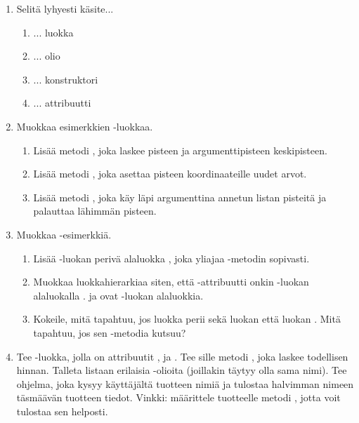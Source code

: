 \begin{enumerate}[\thesection .1]

\item Selitä lyhyesti käsite...
\begin{enumerate}
\item ... luokka
\item ... olio
\item ... konstruktori
\item ... attribuutti
\end{enumerate}

\item Muokkaa esimerkkien -luokkaa.
\begin{enumerate}
\item Lisää metodi , joka laskee pisteen ja argumenttipisteen keskipisteen.
\item Lisää metodi , joka asettaa pisteen koordinaateille uudet arvot.
\item Lisää metodi , joka käy läpi argumenttina annetun listan pisteitä ja palauttaa lähimmän pisteen.
\end{enumerate}

\item Muokkaa -esimerkkiä.
\begin{enumerate}
\item Lisää -luokan perivä alaluokka , joka yliajaa -metodin sopivasti.
\item Muokkaa luokkahierarkiaa siten, että -attribuutti onkin -luokan alaluokalla .  ja  ovat -luokan alaluokkia.
\item Kokeile, mitä tapahtuu, jos luokka  perii sekä luokan  että luokan . Mitä tapahtuu, jos sen -metodia kutsuu?
\end{enumerate}

\item Tee -luokka, jolla on attribuutit ,  ja . Tee sille metodi , joka laskee todellisen hinnan. Talleta listaan erilaisia -olioita (joillakin täytyy olla sama nimi). Tee ohjelma, joka kysyy käyttäjältä tuotteen nimiä ja tulostaa halvimman nimeen täsmäävän tuotteen tiedot. Vinkki: määrittele tuotteelle metodi , jotta voit tulostaa sen helposti.

\end{enumerate}
